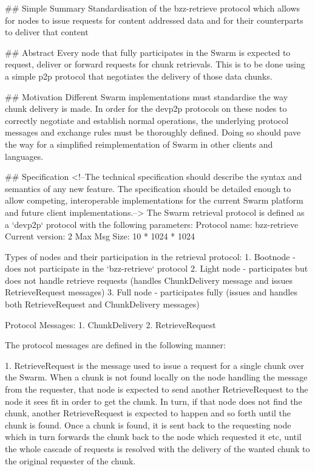 ## Simple Summary
Standardisation of the bzz-retrieve protocol which allows for nodes to issue requests for content addressed data and for their counterparts to deliver that content

## Abstract
Every node that fully participates in the Swarm is expected to request, deliver or forward requests for chunk retrievals. This is to be done using a simple p2p protocol that negotiates the delivery of those data chunks.

## Motivation
Different Swarm implementations must standardise the way chunk delivery is made. In order for the devp2p protocols on these nodes to correctly negotiate and establish normal operations, the underlying protocol messages and exchange rules must be thoroughly defined. Doing so should pave the way for a simplified reimplementation of Swarm in other clients and languages.

## Specification
<!--The technical specification should describe the syntax and semantics of any new feature. The specification should be detailed enough to allow competing, interoperable implementations for the current Swarm platform and future client implementations.-->
The Swarm retrieval protocol is defined as a `devp2p` protocol with the following parameters:
Protocol name:    bzz-retrieve
Current version:  2
Max Msg Size:     10 * 1024 * 1024

Types of nodes and their participation in the retrieval protocol:
1. Bootnode - does not participate in the `bzz-retrieve` protocol
2. Light node - participates but does not handle retrieve requests (handles ChunkDelivery message and issues RetrieveRequest messages)
3. Full node - participates fully (issues and handles both RetrieveRequest and ChunkDelivery messages)

Protocol Messages:
1. ChunkDelivery
2. RetrieveRequest

The protocol messages are defined in the following manner:

1. RetrieveRequest is the message used to issue a request for a single chunk over the Swarm. When a chunk is not found locally on the node handling the message from the requester, that node is expected to send another
RetrieveRequest to the node it sees fit in order to get the chunk. In turn, if that node does not find the chunk, another RetrieveRequest is expected to happen and so forth until the chunk is found.
Once a chunk is found, it is sent back to the requesting node which in turn forwards the chunk back to the node which requested it etc, until the whole cascade of requests is resolved with the delivery of the
wanted chunk to the original requester of the chunk.

